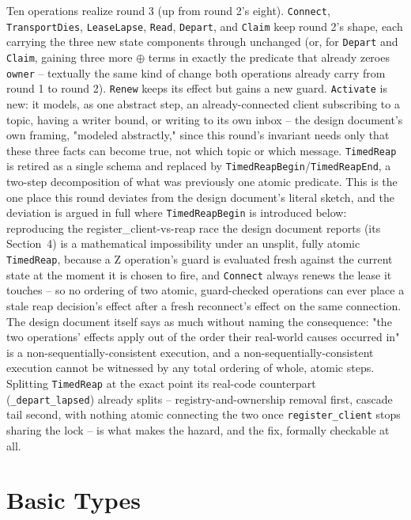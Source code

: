 \documentclass[a4paper,10pt,fleqn]{article}
\begin{document}
Ten operations realize round 3 (up from round 2's eight).
\texttt{Connect}, \texttt{TransportDies}, \texttt{LeaseLapse}, \texttt{Read},
\texttt{Depart}, and \texttt{Claim} keep round 2's shape, each carrying the
three new state components through unchanged (or, for \texttt{Depart} and
\texttt{Claim}, gaining three more \(\oplus\) terms in exactly the predicate
that already zeroes \texttt{owner} -- textually the same kind of change both
operations already carry from round 1 to round 2). \texttt{Renew} keeps its
effect but gains a new guard. \texttt{Activate} is new: it models, as one
abstract step, an already-connected client subscribing to a topic, having a
writer bound, or writing to its own inbox -- the design document's own
framing, "modeled abstractly," since this round's invariant needs only that
these three facts can become true, not which topic or which message.
\texttt{TimedReap} is retired as a single schema and replaced by
\texttt{TimedReapBegin}/\texttt{TimedReapEnd}, a two-step decomposition of
what was previously one atomic predicate. This is the one place this round
deviates from the design document's literal sketch, and the deviation is
argued in full where \texttt{TimedReapBegin} is introduced below: reproducing
the register\_client-vs-reap race the design document reports (its
Section~4) is a mathematical impossibility under an unsplit, fully atomic
\texttt{TimedReap}, because a Z operation's guard is evaluated fresh against
the current state at the moment it is chosen to fire, and \texttt{Connect}
always renews the lease it touches -- so no ordering of two atomic,
guard-checked operations can ever place a stale reap decision's effect after
a fresh reconnect's effect on the same connection. The design document itself
says as much without naming the consequence: "the two operations' effects
apply out of the order their real-world causes occurred in" is a
non-sequentially-consistent execution, and a non-sequentially-consistent
execution cannot be witnessed by any total ordering of whole, atomic steps.
Splitting \texttt{TimedReap} at the exact point its real-code counterpart
(\texttt{\_depart\_lapsed}) already splits -- registry-and-ownership removal
first, cascade tail second, with nothing atomic connecting the two once
\texttt{register\_client} stops sharing the lock -- is what makes the
hazard, and the fix, formally checkable at all.

\section{Basic Types}
\end{document}
